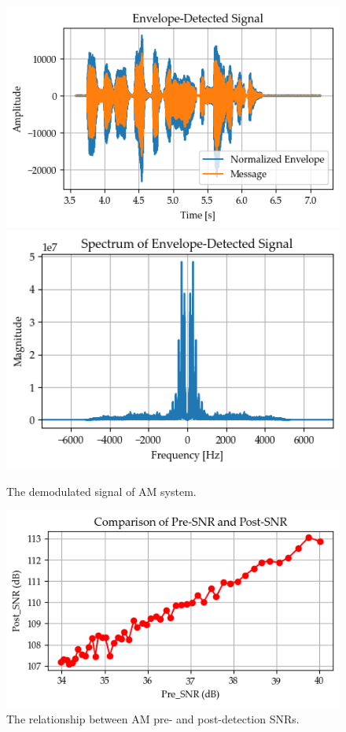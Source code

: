 \documentclass[../ECE459FinalProjectReport.tex]{subfiles}
\begin{document}
\begin{figure}[b]
    \centering
    \includegraphics[width=0.49\linewidth]{plots/am/detected_time.png}
    \includegraphics[width=0.49\linewidth]{plots/am/detected_spectrum.png}
    \caption{The demodulated signal of AM system.}
    \label{fig:am-demodulated}
\end{figure}
\begin{figure}[b]
    \centering
    \includegraphics[width=0.6\linewidth]{plots/am/am_snr_relation.png}
    \caption{The relationship between AM pre- and post-detection SNRs.}
    \label{fig:am-snr-relation}
\end{figure}
\end{document}
